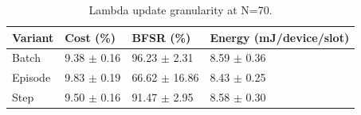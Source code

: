 \begin{table}[t]
\centering
\caption{Lambda update granularity at N=70.}
\label{tab:lambda_update}
\begin{tabular}{llll}
\toprule
Variant & Cost (\%) & BFSR (\%) & Energy (mJ/device/slot) \\
\midrule
Batch & 9.38 $\pm$ 0.16 & 96.23 $\pm$ 2.31 & 8.59 $\pm$ 0.36 \\
Episode & 9.83 $\pm$ 0.19 & 66.62 $\pm$ 16.86 & 8.43 $\pm$ 0.25 \\
Step & 9.50 $\pm$ 0.16 & 91.47 $\pm$ 2.95 & 8.58 $\pm$ 0.30 \\
\bottomrule
\end{tabular}
\end{table}
